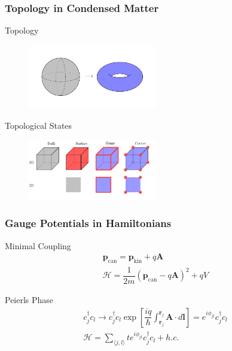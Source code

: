 \documentclass[xcolor=dvipsnames,10pt,aspectratio=169]{beamer}
\renewcommand{\vec}[1]{\mathbf{#1}}
\newcommand{\ham}{\mathcal{H}}
\newcommand{\cc}{c^{\dagger}}
\begin{document}
  \begin{frame}
  \frametitle{Topology in Condensed Matter}

  \begin{multicols}{2}
  \centering Topology
  \begin{figure}
    \includegraphics[width=0.5\textwidth]{./figures/topology.pdf}
  \end{figure}
  \pause
  \vspace{10em}

  \centering Topological States
  \begin{figure}
    \includegraphics[width=0.5\textwidth]{./figures/topological-states.pdf}
  \end{figure}

  \end{multicols}



  \end{frame}

  \begin{frame}
  \frametitle{Gauge Potentials in Hamiltonians}

  \centering Minimal Coupling
  \begin{gather}
    \vec{p}_{\text{can}} = \vec{p}_{\text{kin}} + q\vec{A} \\
    \ham = \dfrac{1}{2m} {\left( \vec{p}_{\text{can}} - q\vec{A} \right)}^2 + qV
  \end{gather}
  \vspace{1em}
  \pause

  \centering Peierls Phase
  \begin{gather}
    \cc_j c_l \rightarrow \cc_j c_l \exp{\left[ \dfrac{iq}{\hbar} \int_{\vec{r}_j}^{\vec{r}_j} \vec{A}\cdot d\vec{l} \right]} = e^{i\phi_{jl}} \cc_j c_l \\
    \ham = \sum_{\langle j, l \rangle} t e^{i\phi_{jl}} \cc_j c_l + h.c.
  \end{gather}


  \end{frame}
\end{document}
